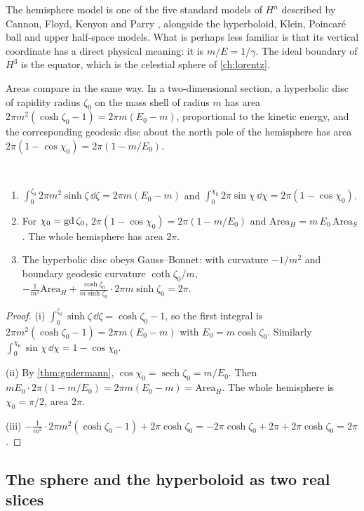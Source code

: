 The hemisphere model is one of the five standard models of $H^n$ described by Cannon, Floyd, Kenyon and Parry \cite{CFKP}, alongside the hyperboloid, Klein, Poincar\'e ball and upper half-space models. What is perhaps less familiar is that its vertical coordinate has a direct physical meaning: it is $m/E=1/\gamma$. The ideal boundary of $H^3$ is the equator, which is the celestial sphere of \cref{ch:lorentz}.

Areas compare in the same way. In a two-dimensional section, a hyperbolic disc of rapidity radius $\zeta_0$ on the mass shell of radius $m$ has area $2\pi m^2(\cosh\zeta_0-1)=2\pi m(E_0-m)$, proportional to the kinetic energy, and the corresponding geodesic disc about the north pole of the hemisphere has area $2\pi(1-\cos\chi_0)=2\pi(1-m/E_0)$.

\begin{proposition}\label{prop:areas}\ver\
\begin{enumerate}[label=(\roman*)]
\item $\int_0^{\zeta_0}2\pi m^2\sinh\zeta\,\dd\zeta=2\pi m(E_0-m)$ and $\int_0^{\chi_0}2\pi\sin\chi\,\dd\chi=2\pi(1-\cos\chi_0)$.
\item For $\chi_0=\operatorname{gd}\zeta_0$, $2\pi(1-\cos\chi_0)=2\pi(1-m/E_0)$ and $\mathrm{Area}_H=m\,E_0\,\mathrm{Area}_S$. The whole hemisphere has area $2\pi$.
\item The hyperbolic disc obeys Gauss--Bonnet: with curvature $-1/m^2$ and boundary geodesic curvature $\coth\zeta_0/m$, $-\frac{1}{m^2}\mathrm{Area}_H+\frac{\cosh\zeta_0}{m\sinh\zeta_0}\cdot2\pi m\sinh\zeta_0=2\pi$.
\end{enumerate}
\end{proposition}
\begin{proof}
(i) $\int_0^{\zeta_0}\sinh\zeta\,\dd\zeta=\cosh\zeta_0-1$, so the first integral is $2\pi m^2(\cosh\zeta_0-1)=2\pi m(E_0-m)$ with $E_0=m\cosh\zeta_0$. Similarly $\int_0^{\chi_0}\sin\chi\,\dd\chi=1-\cos\chi_0$.

(ii) By \cref{thm:gudermann}, $\cos\chi_0=\operatorname{sech}\zeta_0=m/E_0$. Then $mE_0\cdot2\pi(1-m/E_0)=2\pi m(E_0-m)=\mathrm{Area}_H$. The whole hemisphere is $\chi_0=\pi/2$, area $2\pi$.

(iii) $-\frac1{m^2}\cdot2\pi m^2(\cosh\zeta_0-1)+2\pi\cosh\zeta_0=-2\pi\cosh\zeta_0+2\pi+2\pi\cosh\zeta_0=2\pi$.
\end{proof}


\subsection*{The sphere and the hyperboloid as two real slices}

